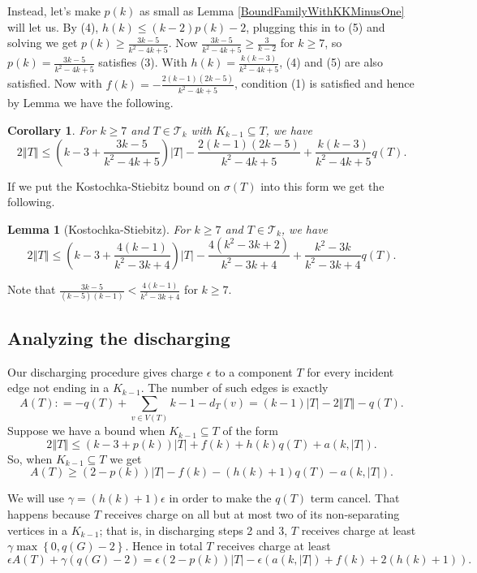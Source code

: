 \documentclass[12pt]{article}
\theoremstyle{plain}
\newtheorem{lem}[thm]{Lemma}
\newtheorem{cor}[thm]{Corollary}
\theoremstyle{definition}
\theoremstyle{remark}
\newcommand{\fancy}[1]{\mathcal{#1}}
\newcommand{\T}{\fancy{T}}
\newcommand{\set}[1]{\left\{ #1 \right\}}
\newcommand{\card}[1]{\left|#1\right|}
\newcommand{\size}[1]{\left\Vert#1\right\Vert}
\newcommand{\parens}[1]{\left( #1 \right)}
\newcommand{\DefinedAs}{\mathrel{\mathop:}=}
\begin{document}
Instead, let's make $p(k)$ as small as Lemma \ref{BoundFamilyWithKKMinusOne} will let us. By (4), $h(k) \le (k-2)p(k) - 2$, plugging this in to (5) and solving we get $p(k) \ge \frac{3k-5}{k^2 - 4k + 5}$.  Now $\frac{3k-5}{k^2 - 4k + 5} \ge \frac{3}{k-2}$ for $k \ge 7$, so $p(k) = \frac{3k-5}{k^2 - 4k + 5}$ satisfies (3).  With $h(k) = \frac{k(k-3)}{k^2 - 4k + 5}$, (4) and (5) are also satisfied. Now with $f(k) = -\frac{2(k-1)(2k-5)}{k^2 - 4k + 5}$, condition (1) is satisfied and hence by Lemma we have the following.

\begin{cor}\label{SmallP}
	For $k \ge 7$ and $T \in \T_k$ with $K_{k-1} \subseteq T$, we have
	\[2\size{T} \le \parens{k-3 + \frac{3k-5}{k^2 - 4k + 5}}\card{T} - \frac{2(k-1)(2k-5)}{k^2 - 4k + 5} + \frac{k(k-3)}{k^2 - 4k + 5}q(T).\]
\end{cor}

If we put the Kostochka-Stiebitz bound on $\sigma(T)$ into this form we get the following.

\begin{lem}[Kostochka-Stiebitz]
		For $k \ge 7$ and $T \in \T_k$, we have
		\[2\size{T} \le \parens{k-3 + \frac{4(k-1)}{k^2 - 3k + 4}}\card{T} - \frac{4(k^2-3k+2)}{k^2-3k+4} + \frac{k^2 - 3k}{k^2-3k+4}q(T).\]
\end{lem}

Note that $\frac{3k-5}{(k-5)(k-1)} < \frac{4(k-1)}{k^2 - 3k + 4}$ for $k \ge 7$.

\subsection{Analyzing the discharging}
Our discharging procedure gives charge $\epsilon$ to a component $T$ for every incident edge not ending in a $K_{k-1}$.  The number of such edges is exactly
\[A(T) \DefinedAs -q(T) + \sum_{v \in V(T)} k-1 - d_T(v) = (k-1)\card{T} - 2\size{T} - q(T).\]
Suppose we have a bound when $K_{k-1} \subseteq T$ of the form
\[2\size{T} \le (k-3 + p(k))\card{T} + f(k) + h(k)q(T) + a(k, |T|).\]
So, when $K_{k-1} \subseteq T$ we get
\[A(T) \ge (2-p(k))\card{T} - f(k) - (h(k) + 1)q(T) - a(k, |T|).\]

We will use $\gamma = (h(k) + 1)\epsilon$ in order to make the $q(T)$ term cancel.  That happens because $T$ receives charge on all but at most two of its non-separating vertices in a $K_{k-1}$; that is, in discharging steps 2 and 3, $T$ receives charge at least $\gamma\max\set{0, q(G) - 2}$.   Hence in total $T$ receives charge at least
\[\epsilon A(T) + \gamma(q(G) - 2) = \epsilon\parens{2-p(k)}\card{T} - \epsilon \parens{a(k, |T|) + f(k) + 2(h(k) + 1)}.\]
\end{document}
